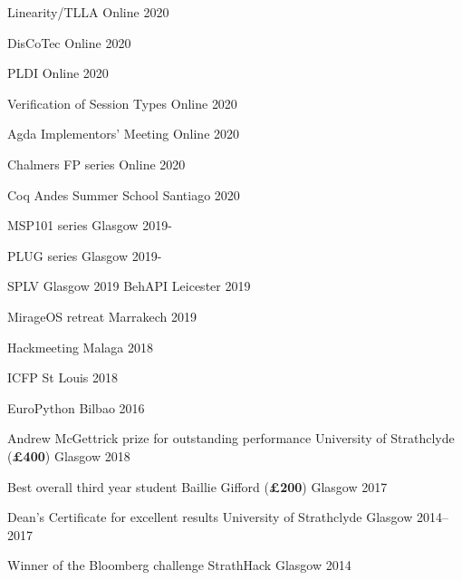 \documentclass[11pt, a4paper]{awesome-cv}
\begin{document}
\begin{minipage}[t]{0.5\linewidth}
\begin{cvhonors}
  \cvhonor
  {Linearity/TLLA}
  {}
  {Online}
  {2020}

  \cvhonor
  {DisCoTec}
  {}
  {Online}
  {2020}

  \cvhonor
  {PLDI}
  {}
  {Online}
  {2020}

  \cvhonor
  {Verification of Session Types}
  {}
  {Online}
  {2020}

  \cvhonor
  {Agda Implementors' Meeting}
  {}
  {Online}
  {2020}

  \cvhonor
  {Chalmers FP series}
  {}
  {Online}
  {2020}

    \cvhonor
      {Coq Andes Summer School}
      {}
      {Santiago}
      {2020}

      \cvhonor
      {MSP101 series}
      {}
      {Glasgow}
      {2019-}
\end{cvhonors}
\end{minipage}
\hspace{0.05\linewidth}
\begin{minipage}[t]{0.5\linewidth}
\begin{cvhonors}

      \cvhonor
      {PLUG series}
      {}
      {Glasgow}
      {2019-}

      \cvhonor
      {SPLV}
      {}
      {Glasgow}
      {2019}
    \cvhonor
      {BehAPI}
      {}
      {Leicester}
      {2019}

    \cvhonor
      {MirageOS retreat}
      {}
      {Marrakech}
      {2019}

    \cvhonor
      {Hackmeeting}
      {}
      {Malaga}
      {2018}

    \cvhonor
      {ICFP}
      {}
      {St Louis}
      {2018}

    \cvhonor
      {EuroPython}
      {}
      {Bilbao}
      {2016}

\end{cvhonors}
\end{minipage}

\newpage
{}

\begin{cvhonors}
  \cvhonor
  {Andrew McGettrick prize for outstanding performance} %
  {University of Strathclyde (\textbf{£400})} %
  {Glasgow} %
  {2018} %
  
  \cvhonor
  {Best overall third year student} %
  {Baillie Gifford (\textbf{£200})} %
  {Glasgow} %
  {2017} %
  
  \cvhonor
  {Dean's Certificate for excellent results} %
  {University of Strathclyde} %
  {Glasgow} %
  {2014--2017} %
  
  \cvhonor
  {Winner of the Bloomberg challenge} %
  {StrathHack} %
  {Glasgow} %
  {2014} %
\end{cvhonors}
\end{document}

